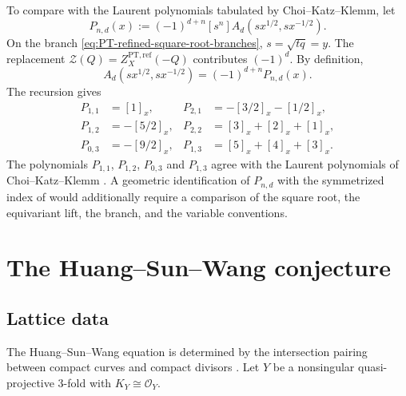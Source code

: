 \documentclass{amsart}
\theoremstyle{definition}
\numberwithin{equation}{section}
\newcommand{\cO}{\mathcal O}
\newcommand{\PT}{\mathrm{PT}}
\begin{document}
To compare with the Laurent polynomials tabulated by Choi--Katz--Klemm, let
\begin{equation}
 P_{n,d}(x)
 :=(-1)^{d+n}[s^n]
 A_d(sx^{1/2},sx^{-1/2}).
\label{eq:P2-CKK-comparison-definition}
\end{equation}
On the branch \eqref{eq:PT-refined-square-root-branches}, \(s=\sqrt{tq}=y\).  The replacement \(\mathcal Z(Q)=Z_X^{\PT,\mathrm{ref}}(-Q)\) contributes \((-1)^d\).  By definition,
\begin{equation}
 [s^n]A_d(sx^{1/2},sx^{-1/2})
 =(-1)^{d+n}P_{n,d}(x).
\label{eq:P2-CKK-comparison-transform}
\end{equation}
The recursion gives
\begin{equation}
\begin{aligned}
 P_{1,1}&=[1]_x,&
 P_{2,1}&=-[3/2]_x-[1/2]_x,\\
 P_{1,2}&=-[5/2]_x,&
 P_{2,2}&=[3]_x+[2]_x+[1]_x,\\
 P_{0,3}&=-[9/2]_x,&
 P_{1,3}&=[5]_x+[4]_x+[3]_x.
\end{aligned}
\label{eq:P2-CKK-comparison-values}
\end{equation}
The polynomials \(P_{1,1}\), \(P_{1,2}\), \(P_{0,3}\) and \(P_{1,3}\) agree with the Laurent polynomials of Choi--Katz--Klemm \cite[Sections~8--9]{ChoiKatzKlemm}.  A geometric identification of \(P_{n,d}\) with the symmetrized index of \cite[Sections~7--8]{ChoiKatzKlemm} would additionally require a comparison of the square root, the equivariant lift, the branch, and the variable conventions.

\section{The Huang--Sun--Wang conjecture}
\label{sec:general-HSW}

\subsection{Lattice data}
The Huang--Sun--Wang equation is determined by the intersection pairing between compact curves and compact divisors \cite[Introduction and Section~3]{HuangSunWang}.  Let \(Y\) be a nonsingular quasi-projective 3-fold with \(K_Y\cong\cO_Y\).
\end{document}
